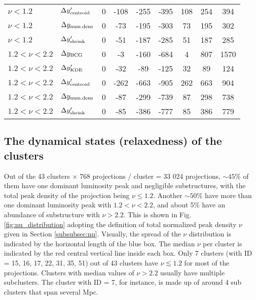 \documentclass[usenatbib]{mn2e}
\begin{document}
{\begin{table*}
\begin{center}
\begin{tabular}{llccccccc}
$\nu < 1.2$ & $\Delta y_{\rm centroid}'$        &        0 &        -108 &        -255 &        -395 &         108 &         254 &         394 \\
$\nu < 1.2$ & $\Delta y_{\rm num. dens}$       &        0 &         -73 &        -195 &        -303 &          73 &         195 &         302 \\
$\nu < 1.2$ & $\Delta y_{\rm shrink}'$         &         0 &         -51 &        -187 &        -285 &          51 &         187 &         285 \\
\midrule
$1.2 < \nu < 2.2$ & $\Delta y_{\rm BCG}$       &         0 &          -3 &        -160 &        -684 &           4 &         807 &        1570 \\
$1.2 < \nu < 2.2$ & $\Delta y_{\rm KDE}'$      &        0 &         -32 &         -89 &        -125 &          32 &          89 &         124 \\
$1.2 < \nu < 2.2$ & $\Delta y_{\rm centroid}'$  &         0 &        -262 &        -663 &        -905 &         262 &         663 &         904 \\
$1.2 < \nu < 2.2$ & $\Delta y_{\rm num. dens}$ &         0 &         -87 &        -299 &        -739 &          87 &         298 &         738 \\
$1.2 < \nu < 2.2$ & $\Delta y_{\rm shrink}'$   &        0 &         -85 &        -386 &        -777 &          85 &         386 &         779 \\
\bottomrule
\end{tabular}

\end{center}
\end{table*}



\subsection{The dynamical states (relaxedness) of the clusters}
\label{subsec:nu_results}
Out of the 43 clusters $ \times$ 768 projections / cluster  = 33 024 projections, $\sim 45\%$ of them
have one dominant luminosity peak and negligible substructures, with the total peak density of the
projection being $\nu \leq 1.2$. 
Another $\sim 50\%$ have more than one dominant luminosity
peak with $1.2 < \nu < 2.2$, and about 5\% have an abundance of substructure with $\nu>2.2$. This is shown in Fig.
\ref{fig:nu_distribution} adopting the definition of total normalized peak density $\nu$ given in Section \ref{subsubsec:nu}.
Visually, the spread of the $\nu$ distribution is indicated by the horizontal 
length of the blue box. 
The median $\nu$ per cluster is indicated by the red central vertical line
inside each box.
Only 7 clusters (with ID = 15, 16, 17, 22, 31, 35, 51) out of 43 clusters have $\nu
\lesssim 1.2$ for most of the projections.
Clusters with median values of $\nu > 2.2$ usually have multiple subclusters.
The cluster with ID = 7, for instance, is made up of around 4 sub clusters that span
several Mpc.  

}
\end{document}
